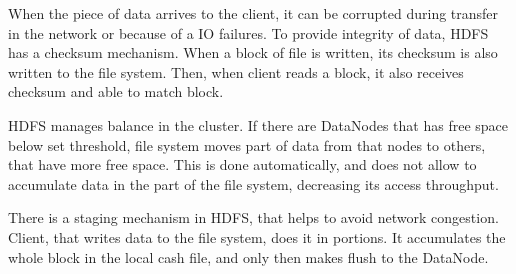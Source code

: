 When the piece of data arrives to the client, it can be corrupted during transfer in the network or because of a IO failures.
To provide integrity of data, HDFS has a checksum mechanism.
When a block of file is written, its checksum is also written to the file system.
Then, when client reads a block, it also receives checksum and able to match block.

HDFS manages balance in the cluster.
If there are DataNodes that has free space below set threshold, file system moves part of data from that nodes to others, that have more free space.
This is done automatically, and does not allow to accumulate data in the part of the file system, decreasing its access throughput.

There is a staging mechanism in HDFS, that helps to avoid network congestion.
Client, that writes data to the file system, does it in portions.
It accumulates the whole block in the local cash file, and only then makes flush to the DataNode.